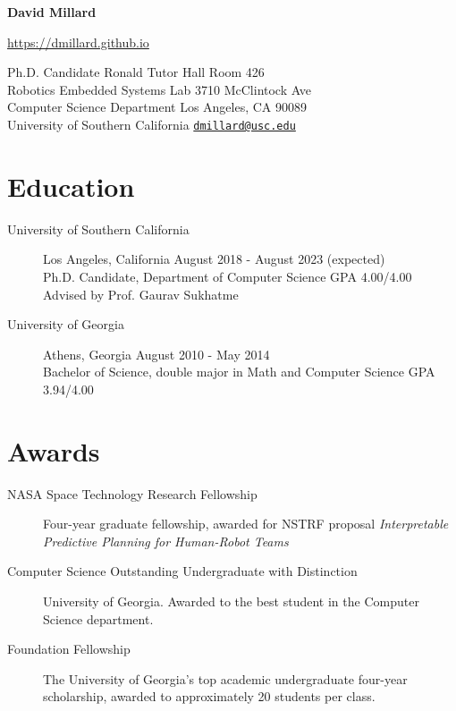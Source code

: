 \documentclass{article}
\begin{document}
\nocite{*}

\begin{center}
  {\huge \textbf{David Millard}}
\end{center}

\begin{center}
    \url{https://dmillard.github.io}
\end{center}

\vspace{1em}

Ph.D. Candidate \hfill Ronald Tutor Hall Room 426\\
Robotics Embedded Systems Lab \hfill 3710 McClintock Ave\\
Computer Science Department \hfill Los Angeles, CA 90089\\
University of Southern California \hfill \href{mailto:dmillard@usc.edu}{\nolinkurl{dmillard@usc.edu}}

\section*{Education}

\begin{description}
\item[University of Southern California]
    Los Angeles, California \hfill August 2018 - August 2023 (expected)\\
    Ph.D. Candidate, Department of Computer Science \hfill GPA 4.00/4.00\\
    Advised by Prof. Gaurav Sukhatme
    
\item[University of Georgia]
    Athens, Georgia \hfill August 2010 - May 2014\\
    Bachelor of Science, double major in Math and Computer Science \hfill GPA 3.94/4.00
\end{description}

\section*{Awards}
\begin{description}
\item[NASA Space Technology Research Fellowship]
    Four-year graduate fellowship, awarded for NSTRF proposal \emph{Interpretable Predictive Planning for Human-Robot Teams}

\item[Computer Science Outstanding Undergraduate with Distinction]
    University of Georgia. Awarded to the best student in the Computer Science department.
    
\item[Foundation Fellowship]
    The University of Georgia's top academic undergraduate four-year
    scholarship, awarded to approximately 20 students per class.
\end{description}
\end{document}
